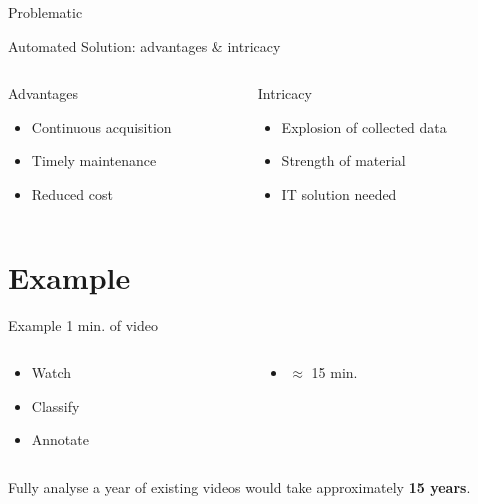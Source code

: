 \documentclass{beamer}
\begin{document}
\begin{frame}[c]{Problematic}

	\center Automated Solution: advantages \& intricacy
	\bigskip
	\pause
	\begin{columns}
 		\begin{column}{0.5\textwidth}
			\center Advantages
			\begin{itemize}
				\item Continuous acquisition
				\item Timely maintenance
				\item Reduced cost
			\end{itemize}
		\end{column}
		\pause
		\begin{column}{0.5\textwidth}
			\center Intricacy
			\begin{itemize}
				\item Explosion of collected data
				\item Strength of material
				\item IT solution needed
			\end{itemize}
		\end{column}
	\end{columns}
\end{frame}

\section{Example}

\begin{frame}[c]{Example}
1 min. of video
\begin{columns}
	\begin{column}{0.5\textwidth}
			\begin{itemize}
				\item Watch
				\item Classify
				\item Annotate
			\end{itemize}
	\end{column}
	\pause
	\begin{column}{0.5\textwidth}
			\begin{itemize}
				\item $\approx$ 15 min.
			\end{itemize}
	\end{column}
\end{columns}
	\pause
\bigskip	
\center Fully analyse a year of existing videos would take approximately \textbf{15 years}.
\end{frame}
\end{document}
